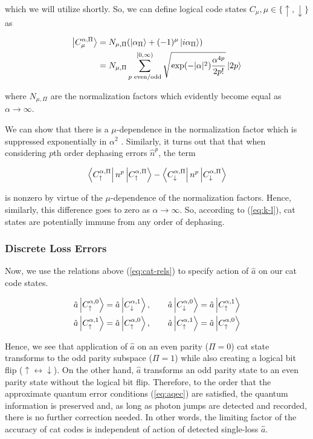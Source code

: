 \documentclass[12]{amsart}
\newcommand\0{\mathbf{0}}
\newcommand\<{\langle}
\renewcommand\>{\rangle}
\begin{document}
which we will utilize shortly. So, we can define logical code states $C_\mu, \mu \in \{ \uparrow, \downarrow \}$ as 

\begin{align*}
\ket{C_\mu^{\alpha, \Pi}} &= N_{\mu, \Pi} (\ket{\alpha_\Pi} + (-1)^\mu \ket{i \alpha_\Pi})\\
&= N_{\mu, \Pi} \sum_{p\text{ even/odd}}^{[0, \infty)}\sqrt{\exp(-|\alpha|^2)\frac{
\alpha^{4p}}{2p!}}\ket{2p}
\end{align*}

where $N_{\mu, \Pi}$ are the normalization factors which evidently become equal as $\alpha \rightarrow \infty$. 


We can show that there is a $\mu$-dependence in the normalization factor which is suppressed exponentially in $\alpha^2$ \cite{albert2018multimode}. Similarly, it turns out that that when considering $p$th order dephasing errors $\hat{n}^p$, the term

$$
\bra{C^{\alpha, \Pi}_{\uparrow}} n^p \ket{C^{\alpha, \Pi}_{\uparrow}} - \bra{C^{\alpha, \Pi}_{\downarrow}} n^p \ket{C^{\alpha, \Pi}_{\downarrow}}
$$ 

is nonzero by virtue of the $\mu$-dependence of the normalization factors. Hence, similarly, this difference goes to zero as $\alpha \rightarrow \infty$. So, according to (\ref{eq:k-l}), cat states are potentially immune from any order of dephasing.

\subsubsection{Discrete Loss Errors}

Now, we use the relations above (\ref{eq:cat-rels}) to specify action of $\hat{a}$ on our cat code states.

\begin{align*}
\hat{a}	\ket{C^{\alpha, 0}_{\uparrow}} &= \hat{a}	\ket{C^{\alpha, 1}_{\downarrow}}, \qquad
\hat{a}	\ket{C^{\alpha, 0}_{\downarrow}} = \hat{a}	\ket{C^{\alpha, 1}_{\uparrow}}\\
\hat{a}	\ket{C^{\alpha, 1}_{\uparrow}} &= \hat{a}	\ket{C^{\alpha, 0}_{\uparrow}},\qquad 
\hat{a}	\ket{C^{\alpha, 1}_{\uparrow}} = \hat{a}	\ket{C^{\alpha, 0}_{\uparrow}}
\end{align*}

Hence, we see that application of $\hat{a}$ on an even parity ($\Pi = 0$) cat state transforms to the odd parity subspace ($\Pi = 1$) while also creating a logical bit flip ($\uparrow \leftrightarrow \downarrow$). On the other hand, $\hat{a}$ transforms an odd parity state to an even parity state without the logical bit flip. Therefore, to the order that the approximate quantum error conditions (\ref{eq:aqec}) are satisfied, the quantum information is preserved and, as long as photon jumps are detected and recorded, there is no further correction needed. In other words, the limiting factor of the accuracy of cat codes is independent of action of detected single-loss $\hat{a}$.
\end{document}
